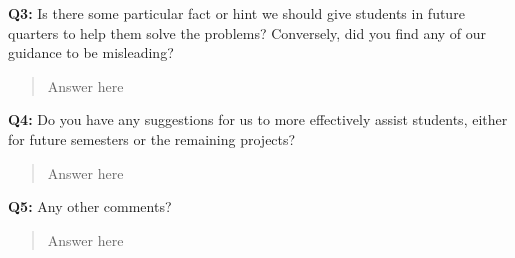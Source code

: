 \documentclass[a4paper,11pt]{paper}
\begin{document}
\textbf{Q3:} Is there some particular fact or hint we should give students in future quarters to help them solve the problems?  Conversely, did you find any of our guidance to be misleading?
\begin{quote}
  Answer here
\end{quote}

\textbf{Q4:} Do you have any suggestions for us to more effectively assist students,
either for future semesters or the remaining projects?
\begin{quote}
  Answer here
\end{quote}

\textbf{Q5:} Any other comments?
\begin{quote}
  Answer here
\end{quote}
\end{document}
